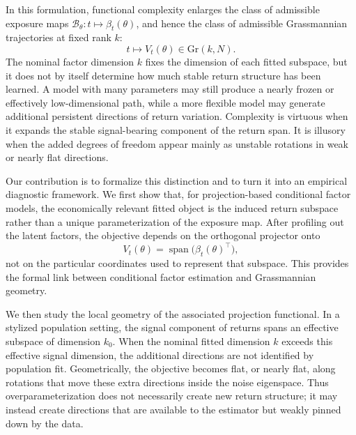 \documentclass[11pt,letterpaper]{article}
\newcommand{\gr}{\mathrm{Gr}}
\newcommand{\cB}{\mathcal{B}}
\begin{document}
In this formulation, functional complexity enlarges the class of admissible exposure maps $\cB_\theta : t \mapsto \beta_t(\theta)$, and hence the class of admissible Grassmannian trajectories at fixed rank $k$:
\begin{equation*}
t \mapsto V_t(\theta)\in\gr(k,N).
\end{equation*}
The nominal factor dimension $k$ fixes the dimension of each fitted subspace, but it does not by itself determine how much stable return structure has been learned. A model with many parameters may still produce a nearly frozen or effectively low-dimensional path, while a more flexible model may generate additional persistent directions of return variation. Complexity is virtuous when it expands the stable signal-bearing component of the return span. It is illusory when the added degrees of freedom appear mainly as unstable rotations in weak or nearly flat directions.

Our contribution is to formalize this distinction and to turn it into an empirical diagnostic framework. We first show that, for projection-based conditional factor models, the economically relevant fitted object is the induced return subspace rather than a unique parameterization of the exposure map. After profiling out the latent factors, the objective depends on the orthogonal projector onto
\begin{equation*}
V_t(\theta)=\operatorname{span}\bigl(\beta_t(\theta)^\top\bigr),
\end{equation*}
not on the particular coordinates used to represent that subspace. This provides the formal link between conditional factor estimation and Grassmannian geometry.

We then study the local geometry of the associated projection functional. In a stylized population setting, the signal component of returns spans an effective subspace of dimension $k_0$. When the nominal fitted dimension $k$ exceeds this effective signal dimension, the additional directions are not identified by population fit. Geometrically, the objective becomes flat, or nearly flat, along rotations that move these extra directions inside the noise eigenspace. Thus overparameterization does not necessarily create new return structure; it may instead create directions that are available to the estimator but weakly pinned down by the data.
\end{document}
